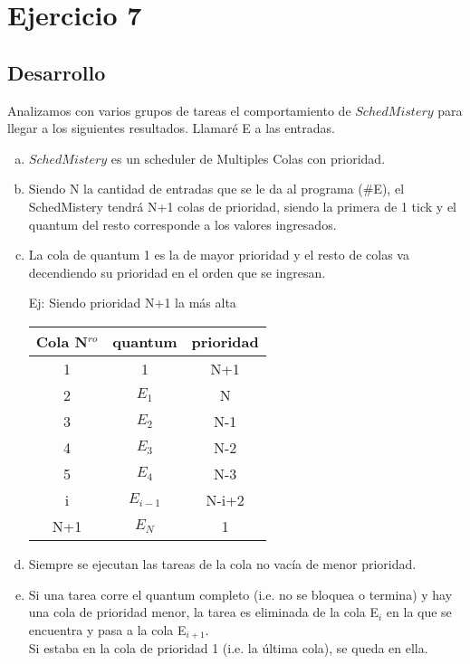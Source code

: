 \section{Ejercicio 7}
\subsection{Desarrollo}
Analizamos con varios grupos de tareas el comportamiento de $SchedMistery$ para llegar a los siguientes resultados. Llamar\'e E a las entradas.

\begin{enumerate}[(a)]

\item $SchedMistery$ es un scheduler de Multiples Colas con prioridad.

\item Siendo N la cantidad de entradas que se le da al programa (\#E), el SchedMistery tendr\'a N+1 colas de prioridad, siendo la primera de 1 tick y el quantum del resto corresponde a los valores ingresados.

\item La cola de quantum 1 es la de mayor prioridad y el resto de colas va decendiendo su prioridad en el orden que se ingresan.

Ej: Siendo prioridad N+1 la m\'as alta
\begin{table}[H]
\centering
\begin{tabular}{ | c | c | c |}
  \hline			
  Cola N$^{ro}$ & quantum & prioridad\\
  \hline
1 	& 1 			& N+1\\
2 	& $E_1$ 		& N\\
3 	& $E_2$ 		& N-1\\
4 	& $E_3$ 		& N-2\\
5 	& $E_4$ 		& N-3\\
  \hline
i 	& $E_{i-1}$ 	& N-i+2\\
  \hline
N+1 & $E_N$ 		& 1\\
  \hline

\end{tabular}
\end{table}

\item Siempre se ejecutan las tareas de la cola no vac\'ia de menor prioridad.

\item Si una tarea corre el quantum completo (i.e. no se bloquea o termina) y hay una cola de prioridad menor, la tarea es eliminada de la cola E$_i$ en la que se encuentra y pasa a la cola E$_{i+1}$.\\
	Si estaba en la cola de prioridad 1 (i.e. la \'ultima cola), se queda en ella.
	

\end{enumerate}
